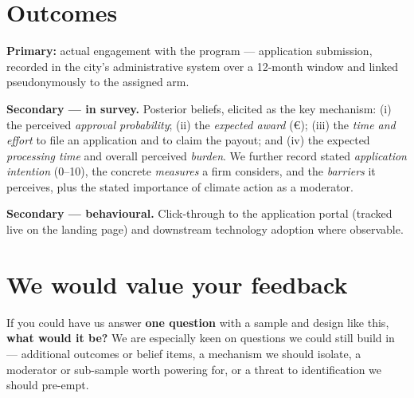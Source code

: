 \documentclass[10pt,a4paper]{article}
\begin{document}
\section*{Outcomes}
\textbf{Primary:} actual engagement with the program --- application
submission, recorded in the city's administrative system over a 12-month
window and linked pseudonymously to the assigned arm.

\textbf{Secondary --- in survey.} Posterior beliefs, elicited as the key
mechanism: (i) the perceived \emph{approval probability}; (ii) the
\emph{expected award} (\euro); (iii) the \emph{time and effort} to file an
application and to claim the payout; and (iv) the expected \emph{processing
time} and overall perceived \emph{burden}. We further record stated
\emph{application intention} (0--10), the concrete \emph{measures} a firm
considers, and the \emph{barriers} it perceives, plus the stated importance
of climate action as a moderator.

\textbf{Secondary --- behavioural.} Click-through to the application portal
(tracked live on the landing page) and downstream technology adoption where
observable.

\section*{We would value your feedback}
If you could have us answer \textbf{one question} with a sample and design
like this, \textbf{what would it be?} We are especially keen on questions we
could still build in --- additional outcomes or belief items, a mechanism we
should isolate, a moderator or sub-sample worth powering for, or a threat to
identification we should pre-empt.
\end{document}
